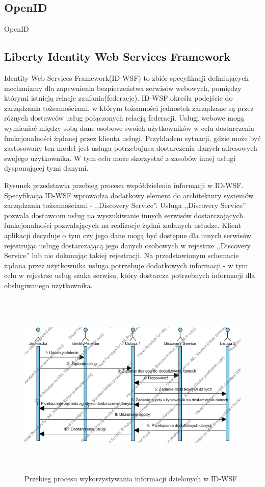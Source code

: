 \subsection{OpenID}

OpenID

\subsection{Liberty Identity Web Services Framework}

	Identity Web Services Framework(ID-WSF) to zbiór specyfikacji definiujących mechanizmy dla zapewnienia bezpieczeństwa serwisów webowych, pomiędzy którymi istnieją relacje zaufania(federacje)\cite{Oracle10}. ID-WSF określa podejście do zarządzania tożsamościami, w którym tożsamości jednostek zarządzane są przez różnych dostawców usług połączonych relacją federacji. Usługi webowe mogą wymieniać między sobą dane osobowe swoich użytkowników w celu dostarczenia funkcjonalności żądanej przez klienta usługi. Przykładem sytuacji, gdzie może być zastosowany ten model jest usługa potrzebująca dostarczenia danych adresowych swojego użytkownika. W tym celu może skorzystać z zasobów innej usługi 
	dysponującej tymi danymi.

	Rysunek przedstawia przebieg procesu współdzielenia informacji w ID-WSF. Specyfikacja ID-WSF wprowadza dodatkowy element do architektury systemów zarządzania tożsamościami - ,,Discovery Service''. Usługa ,,Discovery Service'' pozwala dostawcom usług na wyszukiwanie innych serwisów dostarczających funkcjonalności pozwalających na realizacje żądań zadanych usłudze. Klient aplikacji decyduje o tym czy jego dane mogą być dostępne dla innych serwisów rejestrując usługę dostarczającą jego danych osobowych w rejestrze ,,Discovery Service'' lub nie dokonując takiej rejestracji. Na przedstawionym schemacie żądana przez użytkownika usługa potrzebuje dodatkowych informacji - w tym celu w rejestrze usług szuka serwisu, który dostarcza potrzebnych informacji dla obsługiwanego użytkownika.

	\begin{figure}[h]
		\centering
			\includegraphics[width=15cm,height=9cm]{img/id-wsf.jpg}
		\caption{Przebieg procesu wykorzystywania informacji dzielonych w ID-WSF}
		\label{Przebieg procesu wykorzystywania informacji dzielonych w ID-WSF}
	\end{figure}

